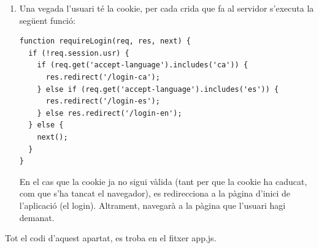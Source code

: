 \documentclass[11pt,catalan,listoffigures,listoftables]{tfgetsinf}
\begin{document}
\begin{enumerate}
\item Una vegada l'usuari té la cookie, per cada crida que fa al servidor s'executa la següent funció:
\begin{lstlisting}
function requireLogin(req, res, next) {
  if (!req.session.usr) {
    if (req.get('accept-language').includes('ca')) {
      res.redirect('/login-ca');
    } else if (req.get('accept-language').includes('es')) {
      res.redirect('/login-es');  
    } else res.redirect('/login-en');
  } else {
    next();
  }
}
\end{lstlisting}
En el cas que la cookie ja no sigui vàlida (tant per que la cookie ha caducat, com que s'ha tancat el navegador), es redirecciona a la pàgina d'inici de l'aplicació (el login). Altrament, navegarà a la pàgina que l'usuari hagi demanat.
\end{enumerate}
Tot el codi d'aquest apartat, es troba en el fitxer app.js.
\end{document}
